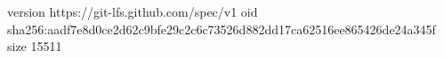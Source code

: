 version https://git-lfs.github.com/spec/v1
oid sha256:aadf7e8d0ce2d62c9bfe29c2c6c73526d882dd17ca62516ee865426de24a345f
size 15511
